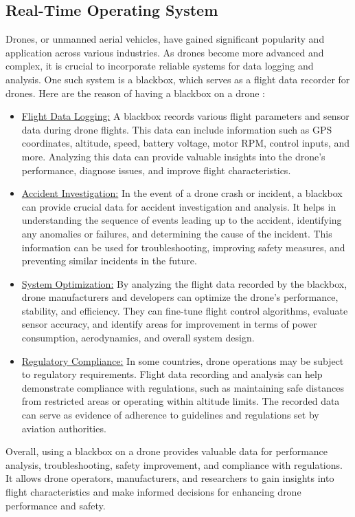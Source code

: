\subsection{Real-Time Operating System}
Drones, or unmanned aerial vehicles, have gained significant popularity and application across various industries. As drones become more advanced and complex, it is crucial to incorporate reliable systems for data logging and analysis. One such system is a blackbox, which serves as a flight data recorder for drones. Here are the reason of having a blackbox on a drone :
\begin{itemize}
    \item \underline{Flight Data Logging:} A blackbox records various flight parameters and sensor data during drone flights. This data can include information such as GPS coordinates, altitude, speed, battery voltage, motor RPM, control inputs, and more. Analyzing this data can provide valuable insights into the drone's performance, diagnose issues, and improve flight characteristics.
    \item \underline{Accident Investigation:} In the event of a drone crash or incident, a blackbox can provide crucial data for accident investigation and analysis. It helps in understanding the sequence of events leading up to the accident, identifying any anomalies or failures, and determining the cause of the incident. This information can be used for troubleshooting, improving safety measures, and preventing similar incidents in the future.
    \item \underline{System Optimization:} By analyzing the flight data recorded by the blackbox, drone manufacturers and developers can optimize the drone's performance, stability, and efficiency. They can fine-tune flight control algorithms, evaluate sensor accuracy, and identify areas for improvement in terms of power consumption, aerodynamics, and overall system design.
    \item \underline{Regulatory Compliance:} In some countries, drone operations may be subject to regulatory requirements. Flight data recording and analysis can help demonstrate compliance with regulations, such as maintaining safe distances from restricted areas or operating within altitude limits. The recorded data can serve as evidence of adherence to guidelines and regulations set by aviation authorities.
\end{itemize}
\hfill \break
Overall, using a blackbox on a drone provides valuable data for performance analysis, troubleshooting, safety improvement, and compliance with regulations. It allows drone operators, manufacturers, and researchers to gain insights into flight characteristics and make informed decisions for enhancing drone performance and safety.
